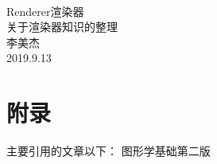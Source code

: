 \documentclass[UTF8]{article}
\begin{document}
\begin{center}
    \quad \\
    \vspace{3cm}
    \hspace{1cm}\Huge{Renderer渲染器} \\
    \small{关于渲染器知识的整理} \\
    \vspace{1cm}
    \hspace{1cm}\Large{李美杰} \\
    \vspace{0.5cm}
    \hspace{1cm}\Large{2019.9.13}
    \clearpage
\end{center}

\thispagestyle{empty}
\clearpage

\tableofcontents
\clearpage

\lstset{
    language=C,
    numbers=left,
    frame=box
}






\clearpage
\section{附录}
主要引用的文章以下：
\cite{RAPI}
\cite{Renderer}
\cite{FoCG2Ed} 图形学基础第二版



\end{document}
